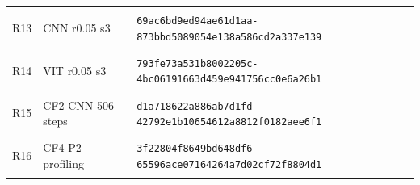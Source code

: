 \begin{longtable}{@{}l>{\raggedright\arraybackslash}p{3.5cm}p{10.8cm}@{}}
\hypertarget{R13}{R13} & CNN r0.05 s3 & {\fontsize{8.8}{11}\selectfont\texttt{69ac6bd9ed94ae61d1aa-873bbd5089054e138a586cd2a337e139}} \\
\hypertarget{R14}{R14} & VIT r0.05 s3 & {\fontsize{8.8}{11}\selectfont\texttt{793fe73a531b8002205c-4bc06191663d459e941756cc0e6a26b1}} \\
\hypertarget{R15}{R15} & CF2 CNN 506 steps & {\fontsize{8.8}{11}\selectfont\texttt{d1a718622a886ab7d1fd-42792e1b10654612a8812f0182aee6f1}} \\
\hypertarget{R16}{R16} & CF4 P2 profiling & {\fontsize{8.8}{11}\selectfont\texttt{3f22804f8649bd648df6-65596ace07164264a7d02cf72f8804d1}} \\
\bottomrule\end{longtable}\endgroup
